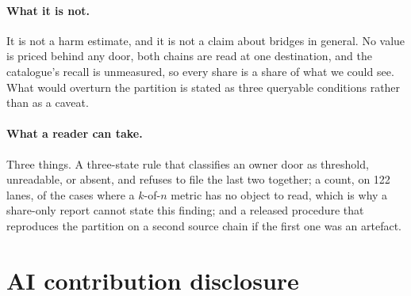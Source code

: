 \documentclass[10pt,a4paper]{article}
\begin{document}
\paragraph{What it is not.}
It is not a harm estimate, and it is not a claim about bridges in general. No value is priced behind any
door, both chains are read at one destination, and the catalogue's recall is unmeasured, so every share is a
share of what we could see. What would overturn the partition is stated as
three queryable conditions rather than as a caveat.

\paragraph{What a reader can take.}
Three things. A three-state rule that classifies an owner door as threshold, unreadable, or absent, and
refuses to file the last two together; a count, on 122 lanes, of the cases where a $k$-of-$n$ metric has no
object to read, which is why a share-only report cannot state this finding; and a released procedure that
reproduces the partition on a second source chain if the first one was an artefact.
\section*{AI contribution disclosure}
\end{document}
